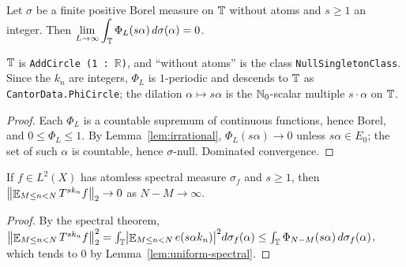 \begin{lemma}
  \label{lem:uniform-spectral}
  \leanok
  Let $\sigma$ be a finite positive Borel measure on $\mathbb{T}$ without atoms and $s \geq 1$ an
  integer.  Then $\displaystyle \lim_{L \to \infty} \int_{\mathbb{T}} \Phi_L(s\alpha) \, d\sigma(\alpha) = 0$.
\end{lemma}

\begin{remark}
  $\mathbb{T}$ is \texttt{AddCircle (1 : \ensuremath{\mathbb{R}})}, and ``without atoms'' is the
  class \texttt{NullSingletonClass}.  Since the $k_n$ are integers, $\Phi_L$ is $1$-periodic
  and descends to $\mathbb{T}$ as \texttt{CantorData.PhiCircle}; the dilation $\alpha \mapsto s\alpha$
  is the $\mathbb{N}_0$-scalar multiple $s \cdot \alpha$ on $\mathbb{T}$.
\end{remark}

\begin{proof}
  \leanok
  Each $\Phi_L$ is a countable supremum of continuous functions, hence Borel, and
  $0 \leq \Phi_L \leq 1$.  By Lemma~\ref{lem:irrational}, $\Phi_L(s\alpha) \to 0$ unless
  $s\alpha \in E_0$; the set of such $\alpha$ is countable, hence $\sigma$-null.  Dominated
  convergence.
\end{proof}

\begin{corollary}
  \label{cor:uniform-ergodic}
  \leanok
  If $f \in L^2(X)$ has atomless spectral measure $\sigma_f$ and $s \geq 1$, then
  $\bigl\lVert \mathop{\mathbb{E}}_{M \leq n < N} T^{s k_n} f \bigr\rVert_2 \to 0$ as $N - M \to \infty$.
\end{corollary}

\begin{proof}
  By the spectral theorem,
  $\bigl\lVert \mathop{\mathbb{E}}_{M \leq n < N} T^{s k_n} f \bigr\rVert_2^2
   = \int_{\mathbb{T}} \bigl\lvert \mathop{\mathbb{E}}_{M \leq n < N} e(s\alpha k_n) \bigr\rvert^2 d\sigma_f(\alpha)
   \leq \int_{\mathbb{T}} \Phi_{N-M}(s\alpha)\, d\sigma_f(\alpha)$,
  which tends to $0$ by Lemma~\ref{lem:uniform-spectral}.
\end{proof}
